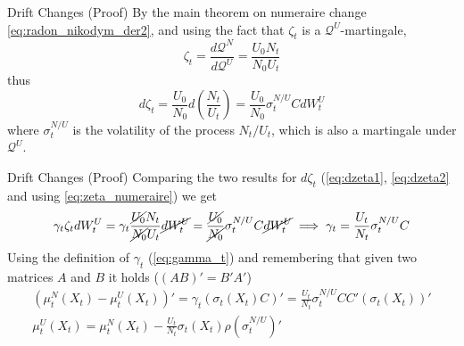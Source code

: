 \documentclass{beamer}
\begin{document}
\begin{frame}{Drift Changes (Proof)}
  By the main theorem on numeraire change \cref{eq:radon_nikodym_der2}, and using the fact that $\zeta_t$ is a $\mathcal{Q}^U$-martingale, 
  \begin{equation}
    \zeta_t = \frac{d\mathcal{Q}^N}{d\mathcal{Q}^U} = \frac{U_0N_t}{N_0U_t}
    \label{eq:zeta_numeraire}
  \end{equation}
  thus
  \begin{equation}
    d\zeta_t= \frac{U_0}{N_0}d\left(\frac{N_t}{U_t}\right)= \frac{U_0}{N_0}\sigma_t^{N/U}CdW_t^U
    \label{eq:dzeta2}
  \end{equation}
  where $\sigma^{N/U}_t$ is the volatility of the process $N_t/U_t$, which is also a martingale under $\mathcal{Q}^U$.
\end{frame}
  
\begin{frame}{Drift Changes (Proof)}
  Comparing the two results for $d\zeta_t$ (\cref{eq:dzeta1}, \cref{eq:dzeta2} and using \cref{eq:zeta_numeraire}) we get
  \begin{equation*}
    \begin{gathered}
      \gamma_t\zeta_tdW_t^U = \gamma_t\frac{\cancel{U_0}N_t}{\cancel{N_0}U_t}\cancel{dW_t^U}=	\frac{\cancel{U_0}}{\cancel{N_0}}\sigma^{N/U}_tC\cancel{dW_t^U} \implies 
      \gamma_t = \frac{U_t}{N_t}\sigma^{N/U}_tC
    \end{gathered}
  \end{equation*}
  \pause
  Using the definition of $\gamma_t$ (\cref{eq:gamma_t}) and remembering that given two matrices $A$ and $B$ it holds ($(AB)' = B'A'$)
  \begin{equation}
    \begin{gathered}
    (\mu_t^N(X_t)-\mu_t^U(X_t))'= \gamma_t (\sigma_t(X_t)C)'=\frac{U_t}{N_t}\sigma^{N/U}_t CC'(\sigma_t(X_t))'\\
    \mu_t^U(X_t)=\mu_t^N(X_t)-\frac{U_t}{N_t}\sigma_t(X_t)\rho(\sigma^{N/U}_t)'
    \end{gathered}
  \label{eq:gamma}
\end{equation}
\end{frame}
\end{document}
